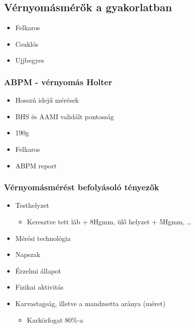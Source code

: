 \subsection{Vérnyomásmérők a gyakorlatban}
\begin{itemize}
    \item Felkaros
    \item Csuklós
    \item Ujjbegyes
\end{itemize}

\subsubsection{ABPM - vérnyomás Holter}
\begin{itemize}
    \item Hosszú idejű mérések
    \item BHS és AAMI validált pontosság
    \item 190g
    \item Felkaros
    \item ABPM report
\end{itemize}

\subsubsection{Vérnyomásmérést befolyásoló tényezők}
\begin{itemize}
    \item Testhelyzet
    \begin{itemize}
        \item Keresztve tett láb + 8Hgmm, ülő helyzet + 5Hgmm, \dots
    \end{itemize}
    \item Mérési technológia
    \item Napszak
    \item Érzelmi állapot
    \item Fizikai aktivitás
    \item Karvastagság, illetve a mandzsetta aránya (méret)
    \begin{itemize}
        \item Karkörfogat 80\%-a
    \end{itemize}
\end{itemize}

\clearpage
